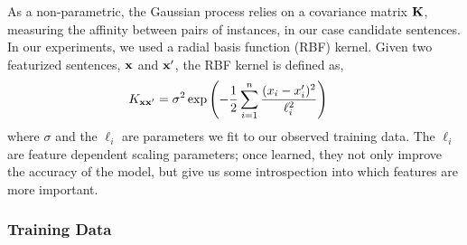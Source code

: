 As a non-parametric, the Gaussian process relies on a  covariance matrix $\mathbf{K}$, measuring the affinity between pairs of instances, in our case candidate sentences.  In our experiments, we used a radial basis function (RBF) kernel.  Given two featurized sentences, $\mathbf{x}$ and $\mathbf{x}^\prime$, the RBF kernel is defined as,
\begin{align*}
        K_{\mathbf{x}\mathbf{x}^\prime}&= \sigma^2 \exp\left(- \frac{1}{2} 
\sum_{i=1}^{n} \frac{ (x_{i}-x_{i}^\prime)^2}{\ell_i^2} \right)
\end{align*}
where $\sigma$ and the $\ell_i$ are parameters we fit to our observed training data. The $\ell_i$ are feature dependent scaling parameters; once learned, they not only improve the accuracy of the model, but give us some introspection  into which features are more important.

\subsubsection{Training Data}

